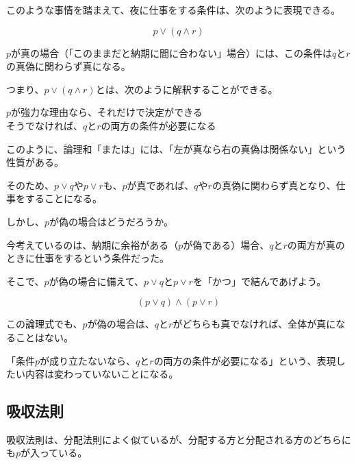 \documentclass[../../imaging-math]{subfiles}
\begin{document}
このような事情を踏まえて、夜に仕事をする条件は、次のように表現できる。

\begin{equation*}
  p \lor (q \land r)
\end{equation*}

$p$が真の場合（「このままだと納期に間に合わない」場合）には、この条件は$q$と$r$の真偽に関わらず真になる。

つまり、$p \lor (q \land r)$とは、次のように解釈することができる。

\begin{emphabox}
  \begin{spacebox}
    \begin{center}
      $p$が強力な理由なら、それだけで決定ができる\\
      そうでなければ、$q$と$r$の両方の条件が必要になる
    \end{center}
  \end{spacebox}
\end{emphabox}

\br

このように、論理和「または」には、「左が真なら右の真偽は関係ない」という性質がある。

そのため、$p \lor q$や$p \lor r$も、$p$が真であれば、$q$や$r$の真偽に関わらず真となり、仕事をすることになる。

\br

しかし、$p$が偽の場合はどうだろうか。

今考えているのは、納期に余裕がある（$p$が偽である）場合、$q$と$r$の両方が真のときに仕事をするという条件だった。

\br

そこで、$p$が偽の場合に備えて、$p \lor q$と$p \lor r$を「かつ」で結んであげよう。

\begin{equation*}
  (p \lor q) \land (p \lor r)
\end{equation*}

この論理式でも、$p$が偽の場合は、$q$と$r$がどちらも真でなければ、全体が真になることはない。

「条件$p$が成り立たないなら、$q$と$r$の両方の条件が必要になる」という、表現したい内容は変わっていないことになる。

\subsection{吸収法則}

吸収法則は、分配法則によく似ているが、分配する方と分配される方のどちらにも$p$が入っている。
\end{document}
